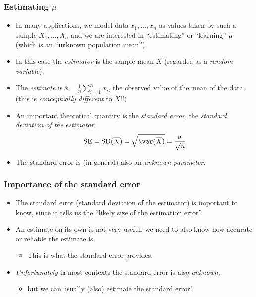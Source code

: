 \documentclass[a4paper]{article}\usepackage[]{graphicx}\usepackage[]{xcolor}
\begin{document}
\subsubsection{Estimating \( \mu \)}
\begin{itemize}
	\item In many applications, we model data \( x_1,\dotsc,x_n \) as values taken by such a sample \( X_1,\dotsc,X_n \) and we are interested in ``estimating'' or ``learning'' \( \mu \) (which is an ``unknown population mean'').
	\item In this case the \textit{estimator} is the sample mean \( \overline{X} \) (regarded as a \textit{random variable}).
	\item The \textit{estimate} is \( \overline{x} = \frac{1}{n} \sum_{i=1}^{n} x_i \), the observed value of the mean of the data (this is \textit{conceptually different} to \( \overline{X} \)!!)
	\item An important theoretical quantity is the \textit{standard error}, the \textit{standard deviation of the estimator}:
	\[
		\mathrm{SE} = \mathrm{SD}(\overline{X}) = \sqrt{\var(\overline{X})} = \frac{\sigma}{\sqrt{n}}
	\]
	\item The standard error is (in general) also an \textit{unknown parameter}.
\end{itemize}
\subsubsection{Importance of the standard error}
\begin{itemize}
	\item The standard error (standard deviation of the estimator) is important to know, since it tells us the ``likely size of the estimation error''.
	\item An estimate on its own is not very useful, we need to also know how accurate or reliable the estimate is.
	\begin{itemize}
		\item This is what the standard error provides.
	\end{itemize}
	\item \textit{Unfortunately} in most contexts the standard error is also \textit{unknown},
	\begin{itemize}
		\item but we can usually (also) estimate the standard error!
	\end{itemize}
\end{itemize}
\end{document}
